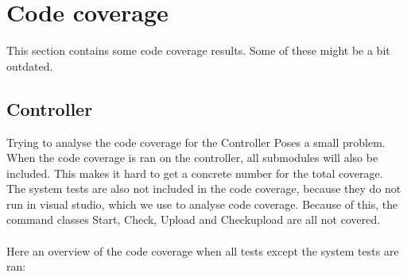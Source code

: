 \documentclass[./Main.tex]{subfiles}
\begin{document}
\section{Code coverage}
This section contains some code coverage results. Some of these might be a bit outdated.
\tocless\subsection{Controller}
Trying to analyse the code coverage for the Controller Poses a small problem. When the code coverage is ran on the controller, all submodules will also be included. This makes it hard to get a concrete number for the total coverage.\\
The system tests are also not included in the code coverage, because they do not run in visual studio, which we use to analyse code coverage. Because of this, the command classes Start, Check, Upload and Checkupload are all not covered.\\\\
Here an overview of the code coverage when all tests except the system tests are ran:\\
\end{document}
